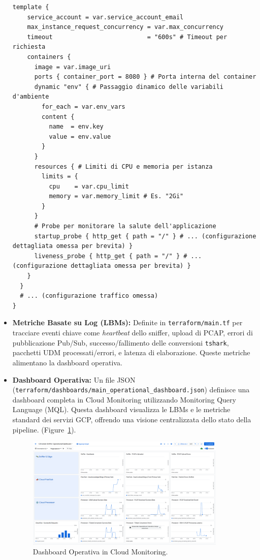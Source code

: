 \documentclass[11pt, a4paper]{article}
\begin{document}
\begin{itemize}
\begin{lstlisting}[language=HCL, style=hclstyle, caption={Estratto da \texttt{terraform/modules/cloudrun\_processor/main.tf}}, label=lst:tf_cloudrun_svc, basicstyle=\ttfamily\scriptsize]
  template {
    service_account = var.service_account_email
    max_instance_request_concurrency = var.max_concurrency
    timeout                          = "600s" # Timeout per richiesta
    containers {
      image = var.image_uri
      ports { container_port = 8080 } # Porta interna del container
      dynamic "env" { # Passaggio dinamico delle variabili d'ambiente
        for_each = var.env_vars
        content {
          name  = env.key
          value = env.value
        }
      }
      resources { # Limiti di CPU e memoria per istanza
        limits = {
          cpu    = var.cpu_limit
          memory = var.memory_limit # Es. "2Gi"
        }
      }
      # Probe per monitorare la salute dell'applicazione
      startup_probe { http_get { path = "/" } # ... (configurazione dettagliata omessa per brevita) }
      liveness_probe { http_get { path = "/" } # ... (configurazione dettagliata omessa per brevita) }
    }
  }
  # ... (configurazione traffico omessa)
}
    \end{lstlisting}
    \item \textbf{Metriche Basate su Log (LBMs):} Definite in \texttt{terraform/main.tf} per tracciare eventi chiave come \textit{heartbeat} dello sniffer, upload di PCAP, errori di pubblicazione Pub/Sub, successo/fallimento delle conversioni \texttt{tshark}, pacchetti UDM processati/errori, e latenza di elaborazione. Queste metriche alimentano la dashboard operativa.
    \item \textbf{Dashboard Operativa:} Un file JSON (\texttt{terraform/dashboards/\allowbreak main\_operational\_dashboard.json}) definisce una dashboard completa in Cloud Monitoring utilizzando Monitoring Query Language (MQL). Questa dashboard visualizza le LBMs e le metriche standard dei servizi GCP, offrendo una visione centralizzata dello stato della pipeline. (Figure~\ref{fig:dashboard}).
    \begin{figure}[!htbp]
        \centering
        \includegraphics[width=0.9\textwidth]{pics/DASHBOARD.png}
        \caption{Dashboard Operativa in Cloud Monitoring.}
        \label{fig:dashboard}
    \end{figure} 
    

\end{itemize}
\end{document}
